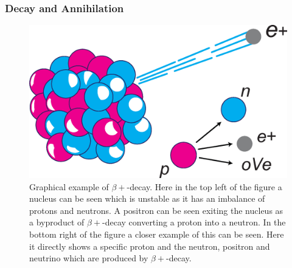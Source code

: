             \subsubsection{Decay and Annihilation} \label{sec:decay_and_annihilation}
                \begin{figure}
                    \centering
                    
                    \includegraphics[width=1.0\linewidth]{figures/background_beta_plus_decay.png}
                    
                    \captionsetup{singlelinecheck=false, justification=raggedright}
                    \caption{Graphical example of $\beta+$-decay. Here in the top left of the figure a nucleus can be seen which is unstable as it has an imbalance of protons and neutrons. A positron can be seen exiting the nucleus as a byproduct of $\beta+$-decay converting a proton into a neutron. In the bottom right of the figure a closer example of this can be seen. Here it directly shows a specific proton and the neutron, positron and neutrino which are produced by $\beta+$-decay.} \label{fig:decay_and_annihilation_beta_plus_decay}
                \end{figure}
                
